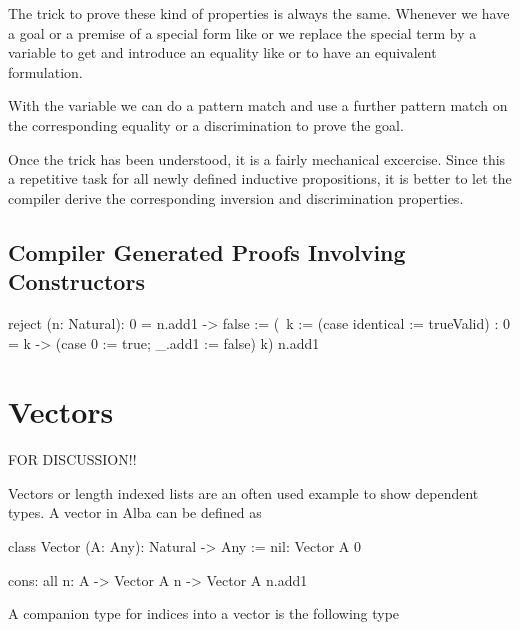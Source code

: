 The trick to prove these kind of properties is always the same. Whenever we have
a goal or a premise of a special form like  or
 we replace the special term by a variable to get
 and introduce an equality like  or  to have an equivalent formulation.

With the variable we can do a pattern match and use a further pattern match on
the corresponding equality or a discrimination to prove the goal.

Once the trick has been understood, it is a fairly mechanical excercise. Since
this a repetitive task for all newly defined inductive propositions, it is
better to let the compiler derive the corresponding inversion and discrimination
properties.



\subsection{Compiler Generated Proofs Involving Constructors}



\begin{alba}
    reject (n: Natural): 0 = n.add1 -> false
    :=
        (\ k :=
            (case identical := trueValid)
            : 0 = k
              ->
              (case 0 := true; _.add1 := false) k)
          n.add1
\end{alba}


\begin{alba}
\end{alba}





\section{Vectors}


FOR DISCUSSION!!


Vectors or length indexed lists are an often used example to show dependent
types. A vector in Alba can be defined as

\begin{alba}
    class
        Vector (A: Any): Natural -> Any
    :=
        nil: Vector A 0

        cons: all {n}: A -> Vector A n -> Vector A n.add1
\end{alba}

A companion type for indices into a vector is the following type

